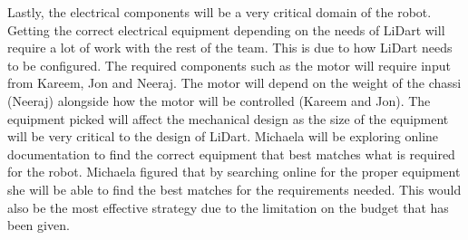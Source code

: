 \documentclass[12pt]{article}
\begin{document}
Lastly, the electrical components will be a very critical domain of the robot. Getting the correct electrical equipment depending on the needs of LiDart will require a lot of work with the rest of the team. This is due to how LiDart needs to be configured. The required components such as the motor will require input from Kareem, Jon and Neeraj. The motor will depend on the weight of the chassi (Neeraj) alongside how the motor will be controlled (Kareem and Jon).
The equipment picked will affect the mechanical design as the size of the equipment will be very critical to the design of LiDart. Michaela will be exploring online documentation to find the correct equipment that best matches what is required for the robot. Michaela figured that by searching online for the proper equipment she will be able to find the best matches for the requirements needed. This would also be the most effective strategy due to the limitation on the budget that has been given.
\end{document}
